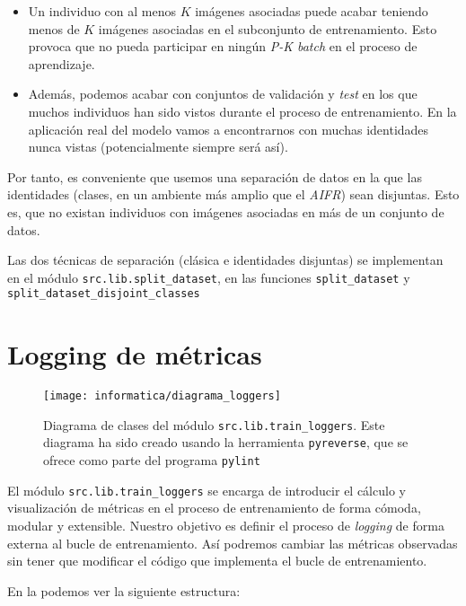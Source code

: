 \begin{itemize}
	\item Un individuo con al menos $K$ imágenes asociadas puede acabar teniendo menos de $K$ imágenes asociadas en el subconjunto de entrenamiento. Esto provoca que no pueda participar en ningún \textit{P-K batch} en el proceso de aprendizaje.
	\item Además, podemos acabar con conjuntos de validación y \textit{test} en los que muchos individuos han sido vistos durante el proceso de entrenamiento. En la aplicación real del modelo vamos a encontrarnos con muchas identidades nunca vistas (potencialmente siempre será así).
\end{itemize}

Por tanto, es conveniente que usemos una separación de datos en la que las identidades (clases, en un ambiente más amplio que el \textit{AIFR}) sean disjuntas. Esto es, que no existan individuos con imágenes asociadas en más de un conjunto de datos.

Las dos técnicas de separación (clásica e identidades disjuntas) se implementan en el módulo \lstinline{src.lib.split_dataset}, en las funciones \lstinline{split_dataset} y \lstinline{split_dataset_disjoint_classes}

\section{Logging de métricas} \label{isec:loggin_metricas}

\begin{figure}[H]
	\centering
	\texttt{[image: informatica/diagrama\_loggers]}
	\caption{Diagrama de clases del módulo \lstinline{src.lib.train_loggers}. Este diagrama ha sido creado usando la herramienta \lstinline{pyreverse}, que se ofrece como parte del programa \lstinline{pylint}}
	\label{img:diagrama_clases_loggers}
\end{figure}

El módulo \lstinline{src.lib.train_loggers} se encarga de introducir el cálculo y visualización de métricas en el proceso de entrenamiento de forma cómoda, modular y extensible. Nuestro objetivo es definir el proceso de \textit{logging} de forma externa al bucle de entrenamiento. Así podremos cambiar las métricas observadas sin tener que modificar el código que implementa el bucle de entrenamiento.

En la  podemos ver la siguiente estructura:

